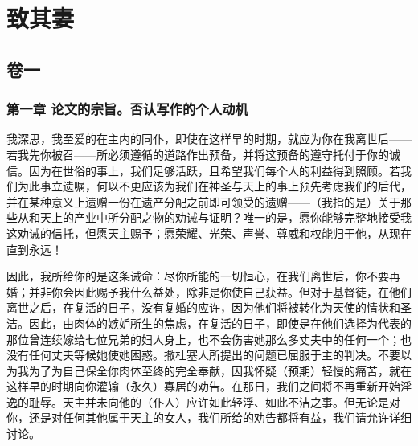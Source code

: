 
\chapter{致其妻}



\section{卷一}


\subsection{第一章 论文的宗旨。否认写作的个人动机}

我深思，我至爱的在主内的同仆，即使在这样早的时期，就应为你在我离世后——若我先你被召——所必须遵循的道路作出预备，并将这预备的遵守托付于你的诚信。因为在世俗的事上，我们足够活跃，且希望我们每个人的利益得到照顾。若我们为此事立遗嘱，何以不更应该为我们在神圣与天上的事上预先考虑我们的后代，并在某种意义上遗赠一份在遗产分配之前即可领受的遗赠——（我指的是）关于那些从和天上的产业中所分配之物的劝诫与证明？唯一的是，愿你能够完整地接受我这劝诫的信托，但愿天主赐予；愿荣耀、光荣、声誉、尊威和权能归于他，从现在直到永远！\par

因此，我所给你的是这条诫命：尽你所能的一切恒心，在我们离世后，你不要再婚；并非你会因此赐予我什么益处，除非是你使自己获益。但对于基督徒，在他们离世之后，在复活的日子，没有复婚的应许，因为他们将被转化为天使的情状和圣洁。因此，由肉体的嫉妒所生的焦虑，在复活的日子，即使是在他们选择为代表的那位曾连续嫁给七位兄弟的妇人身上，也不会伤害她那么多丈夫中的任何一个；也没有任何丈夫等候她使她困惑。撒杜塞人所提出的问题已屈服于主的判决。不要以为我为了为自己保全你肉体至终的完全奉献，因我怀疑（预期）轻慢的痛苦，就在这样早的时期向你灌输（永久）寡居的劝告。在那日，我们之间将不再重新开始淫逸的耻辱。天主并未向他的（仆人）应许如此轻浮、如此不洁之事。但无论是对你，还是对任何其他属于天主的女人，我们所给的劝告都将有益，我们请允许详细讨论。\par

